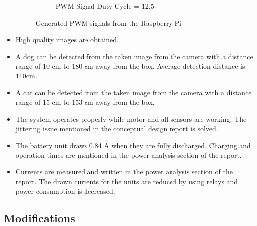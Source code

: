 \begin{itemize}
\begin{figure}[ht]
\begin{subfigure}[b]{0.49\textwidth}
     \caption {PWM Signal Duty Cycle = 12.5}
     \label{fig:pwm125}
     \end{subfigure}        
     \caption{Generated PWM signals from the Raspberry Pi}
     \label{fig:pwmaaa}
\end{figure}
\item High quality images are obtained.
\item A dog can be detected from the taken image from the camera with a distance range of 10 cm to 180 cm away from the box. Average detection distance is 110cm. 
\item A cat can be detected from the taken image from the camera with a distance range of 15 cm to 153 cm away from the box.
\item The system operates properly while motor and all sensors are working. The jittering issue mentioned in the conceptual design report is solved.
\item The battery unit draws 0.84 A when they are fully discharged. Charging and operation times are mentioned in the power analysis section of the report.
\item Currents are measured and written in the power analysis section of the report. The drawn currents for the units are reduced by using relays and power consumption is decreased.
\end{itemize}




\subsection{Modifications}

